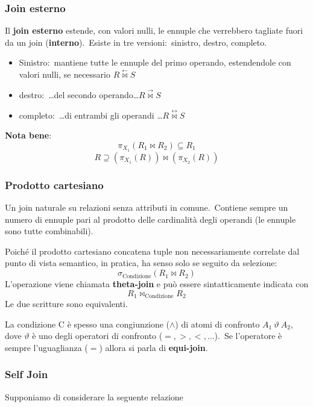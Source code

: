 \subsubsection{Join esterno}
Il \textbf{join esterno} estende, con valori nulli, le ennuple che verrebbero tagliate fuori da un join (\textbf{interno}).\
Esiste in tre versioni:\ sinistro, destro, completo.
\begin{itemize}
	\item Sinistro:\ mantiene tutte le ennuple del primo operando, estendendole con valori nulli, se necessario \qquad $R\stackrel{\leftarrow}{\Join}S$
	\item destro:\ \dots del secondo operando\dots \qquad $R\stackrel{\rightarrow}{\Join}S$
	\item completo:\ \dots di entrambi gli operandi \dots \qquad $R\stackrel{\leftrightarrow}{\Join}S$
\end{itemize}

\noindent\textbf{Nota bene}:\
\[\pi_{X_1}(R_1 \Join R_2) \subseteq R_1\]
\[R \supseteq (\pi_{X_1}(R)) \Join (\pi_{X_2}(R))\]

\subsubsection{Prodotto cartesiano}

Un join naturale su relazioni senza attributi in comune.\
Contiene sempre un numero di ennuple pari al prodotto delle cardinalità degli operandi (le ennuple sono tutte combinabili).

Poiché il prodotto cartesiano concatena tuple non necessariamente correlate dal punto di vista semantico, in pratica, ha senso solo se seguito da selezione:
\[\sigma_{\mathrm{Condizione}} (R_1 \Join R_2)\]
L'operazione viene chiamata \textbf{theta-join} e può essere sintatticamente indicata con
\[R_1 \Join_{\mathrm{Condizione}} R_2\]
Le due scritture sono equivalenti.

La condizione C è spesso una congiunzione ($\land$) di atomi di confronto $A_1\ \vartheta\ A_2$, dove $\vartheta$ è uno degli operatori di confronto ($=, > , <, \dots$).\
Se l'operatore è sempre l'uguaglianza ($=$) allora si parla di \textbf{equi-join}.

\subsubsection{Self Join}
Supponiamo di considerare la seguente relazione

